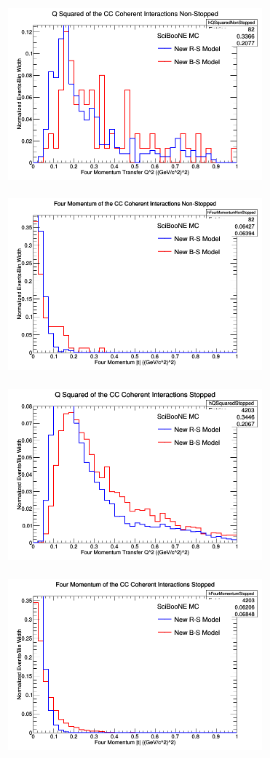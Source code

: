 \documentclass[11pt]{article}
\begin{document}
\begin{figure}[H]
\centering
\includegraphics[width=0.6\textwidth]{ANMFourSquaredPlottingImages/1-ANMFourSquaredPlotting.png}
\caption{}
\end{figure}

\begin{figure}[H]
\centering
\includegraphics[width=0.6\textwidth]{ANMFourSquaredPlottingImages/2-ANMFourSquaredPlotting.png}
\caption{}
\end{figure}

\begin{figure}[H]
\centering
\includegraphics[width=0.6\textwidth]{ANMFourSquaredPlottingImages/3-ANMFourSquaredPlotting.png}
\caption{}
\end{figure}

\begin{figure}[H]
\centering
\includegraphics[width=0.6\textwidth]{ANMFourSquaredPlottingImages/4-ANMFourSquaredPlotting.png}
\caption{}
\end{figure}
\end{document}
